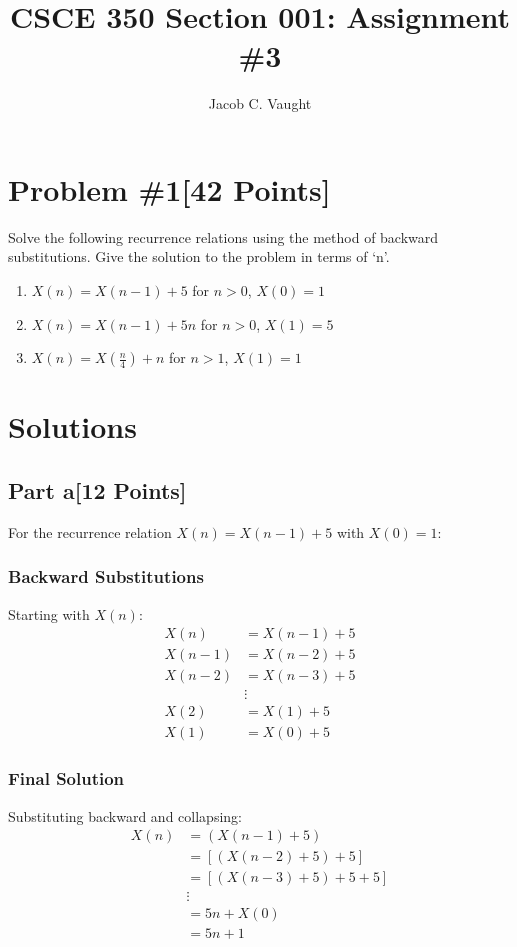 \documentclass[12pt]{article}
\begin{document}
\title{CSCE 350 Section 001: Assignment \#3}
\author{Jacob C. Vaught}
\maketitle

\section*{Problem \#1[42 Points]}
Solve the following recurrence relations using the method of backward substitutions. Give the solution to the problem in terms of `n'.

\begin{enumerate}
    \item \( X(n) = X(n-1) + 5 \) for \( n > 0 \), \( X(0)=1 \)
    \item \( X(n) = X(n-1) + 5n \) for \( n > 0 \), \( X(1)=5 \)
    \item \( X(n) = X\left(\frac{n}{4}\right) + n \) for \( n > 1 \), \( X(1)=1 \)
\end{enumerate}

\section*{Solutions}

\subsection*{Part a[12 Points]}
For the recurrence relation \( X(n) = X(n-1) + 5 \) with \( X(0) = 1 \):

\subsubsection*{Backward Substitutions}
Starting with \(X(n)\):
\begin{align*}
X(n) &= X(n-1) + 5 \\
X(n-1) &= X(n-2) + 5 \\
X(n-2) &= X(n-3) + 5 \\
&\vdots \\
X(2) &= X(1) + 5 \\
X(1) &= X(0) + 5
\end{align*}

\subsubsection*{Final Solution}
Substituting backward and collapsing:
\begin{align*}
X(n) &= (X(n-1) + 5) \\
&= [(X(n-2) + 5) + 5] \\
&= [(X(n-3) + 5) + 5 + 5] \\
&\vdots \\
&= 5n + X(0) \\
&= 5n + 1
\end{align*}
\end{document}
